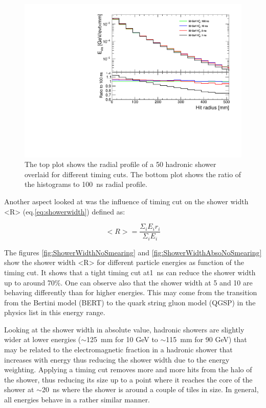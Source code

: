 \begin{figure}[htbp!]
  \centering
  \includegraphics[width=0.7\linewidth]{../Thesis_Plots/ILD/NoSmearing/Plots/RadialProfileOverlay_noSmearing}
  \caption{The top plot shows the radial profile of a 50 \GeV hadronic shower overlaid for different timing cuts. The bottom plot shows the ratio of the histograms to \SI{100}{\nano\second} radial profile.} \label{fig:RadialProfNoSmearing}
\end{figure}

Another aspect looked at was the influence of timing cut on the shower width <R> (eq.\ref{eq:showerwidth}) defined as:

\begin{equation} \label{eq:showerwidth}
  <R> = \frac{\Sigma_i E_i r_i}{\Sigma_i E_i}
\end{equation}
\vspace{1ex}

The figures \ref{fig:ShowerWidthNoSmearing} and \ref{fig:ShowerWidthAbsoNoSmearing} show the shower width <R> for different particle energies as function of the timing cut. It shows that a tight timing cut at\SI{1}{\nano\second} can reduce the shower width up to around 70\%. One can observe also that the shower width at 5 and 10 \GeV are behaving differently than for higher energies. This may come from the transition from the Bertini model (BERT) to the quark string gluon model (QGSP) in the physics list in this energy range.

Looking at the shower width in absolute value, hadronic showers are slightly wider at lower energies ($\sim$\SI{125}{\milli\meter} for 10 GeV to $\sim$\SI{115}{\milli\meter} for 90 GeV) that may be related to the electromagnetic fraction in a hadronic shower that increases with energy thus reducing the shower width due to the energy weighting. Applying a timing cut removes more and more hits from the halo of the shower, thus reducing its size up to a point where it reaches the core of the shower at $\sim$\SI{20}{\nano\second} where the shower is around a couple of tiles in size. In general, all energies behave in a rather similar manner.

